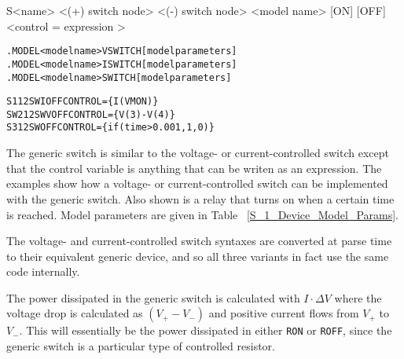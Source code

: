 


\begin{Device}

\device
S<name> <(+) switch node> <(-) switch node> <model name> [ON] [OFF] <control = { expression }>

\model
\begin{alltt}
.MODEL <model name> VSWITCH [model parameters]
.MODEL <model name> ISWITCH [model parameters]
.MODEL <model name> SWITCH [model parameters]
\end{alltt}

\examples
\begin{alltt}
S1 1 2 SWI OFF CONTROL=\{I(VMON)\}
SW2 1 2 SWV OFF CONTROL=\{V(3)-V(4)\}
S3 1 2 SW OFF CONTROL=\{if(time>0.001,1,0)\}
\end{alltt}

\comments

The generic switch is similar to the voltage- or current-controlled
switch except that the control variable is anything that can be writen
as an expression.  The examples show how a voltage- or
current-controlled switch can be implemented with the generic switch.
Also shown is a relay that turns on when a certain time is reached.
Model parameters are given in Table ~\ref{S_1_Device_Model_Params}.

The voltage- and current-controlled switch syntaxes are converted at
parse time to their equivalent generic device, and so all three
variants in fact use the same code internally.

The power dissipated in the generic switch is calculated with $I \cdot \Delta V$ 
where the voltage drop is calculated as $(V_+ - V_-)$ and positive current 
flows from $V_+$ to $V_-$.  This will essentially be the power dissipated
in either \texttt{RON} or \texttt{ROFF}, since the generic switch is a particular 
type of controlled resistor.

\end{Device}
